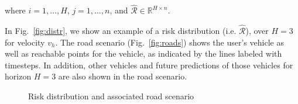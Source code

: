 \documentclass[letterpaper, 10 pt, conference]{ieeeconf}  %
\newcommand\NB[1]{$\spadesuit$\footnote{NB: #1}}
\begin{document}
 where $i = 1,\ldots,H$, $j = 1,\ldots,n$, and $\hat{\mathcal{R}} \in \mathbb{R}^{H\times n}$.
 
 In Fig.~\ref{fig:distr}, we show an example of a risk distribution (i.e. $\hat{\mathcal{R}}$), over $H=3$ for velocity $v_h$. The road scenario (Fig.~\ref{fig:roads}) shows the user's vehicle as well as reachable points for the vehicle, as indicated by the lines labeled with timesteps. In addition, other vehicles and future predictions of those vehicles for horizon $H=3$ are also shown in the road scenario.

\begin{figure}[ht!]
	\centering
	\vspace{-5pt}
	\caption{Risk distribution and associated road scenario}
	\label{fig:riskd}
	\vspace{-5pt}
\end{figure}

\end{document}
